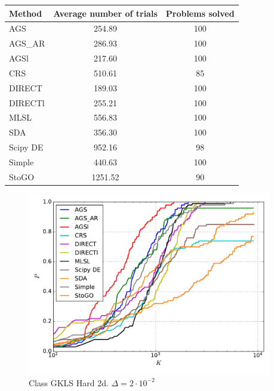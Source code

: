 \documentclass[a4paper]{article}
\begin{document}
\begin{tabular}{lcc}
\hline
 Method   &  Average number of trials  &  Problems solved  \\
\hline
 AGS      &           254.89           &        100        \\
 AGS\_AR   &           286.93           &        100        \\
 AGSl     &           217.60           &        100        \\
 CRS      &           510.61           &        85         \\
 DIRECT   &           189.03           &        100        \\
 DIRECTl  &           255.21           &        100        \\
 MLSL     &           556.83           &        100        \\
 SDA      &           356.30           &        100        \\
 Scipy DE &           952.16           &        98         \\
 Simple   &           440.63           &        100        \\
 StoGO    &          1251.52           &        90         \\
\hline
\end{tabular}
\begin{figure}[H]
  \center
  \includegraphics[width=0.95\textwidth]{../experiments/gklsh2d/cmc.pdf}
  \caption{Class GKLS Hard 2d. $\Delta=2\cdot10^{-2}$}
\end{figure}
\end{document}
